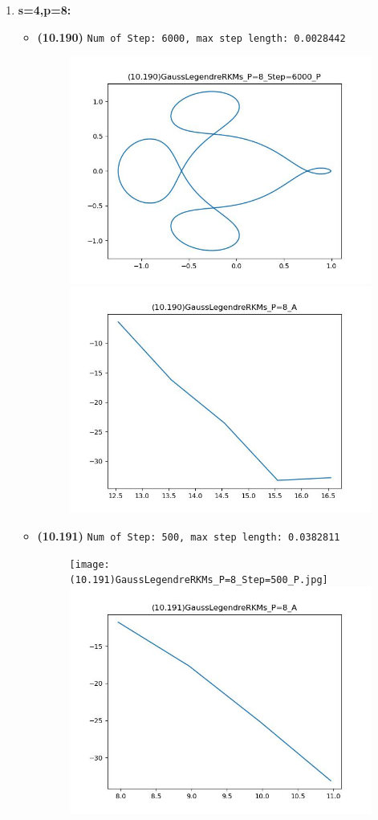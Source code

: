 \documentclass{article}
\begin{document}
\begin{enumerate}
    \item \textbf{s=4,p=8:}
    \begin{itemize}
        \item \textbf{(10.190)} \verb|Num of Step: 6000, max step length: 0.0028442|
        \begin{figure}[h]
            \centering
            \includegraphics[width = 0.45\linewidth]{(10.190)GaussLegendreRKMs_P=8_Step=6000_P.jpg}
            \includegraphics[width = 0.45\linewidth]{(10.190)GaussLegendreRKMs_P=8_A.jpg}
        \end{figure}
        \newpage
        \item \textbf{(10.191)} \verb|Num of Step: 500, max step length: 0.0382811|
        \begin{figure}[h]
            \centering
            \texttt{[image: (10.191)GaussLegendreRKMs\_P=8\_Step=500\_P.jpg]}
            \includegraphics[width = 0.45\linewidth]{(10.191)GaussLegendreRKMs_P=8_A.jpg}
        \end{figure}
    \end{itemize}


\end{enumerate}
\end{document}
